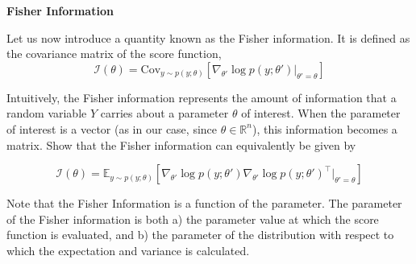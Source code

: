 \ifnum{} {
  \clearpage
} \fi
\item {} \textbf{Fisher Information}

Let us now introduce a quantity known as the Fisher information. It is defined as the covariance matrix of the score function,
$$\mathcal{I}(\theta) = \text{Cov}_{y \sim p(y;\theta)}[\nabla_{\theta'}\log p(y;\theta')|_{\theta'=\theta}]$$

Intuitively, the Fisher information represents the amount of information that a random variable $Y$ carries about a parameter $\theta$ of interest. When the parameter of interest is a vector (as in our case, since $\theta \in \mathbb{R}^n$), this information becomes a matrix. Show that the Fisher information can equivalently be given by

$$\mathcal{I}(\theta)=\mathbb{E}_{y\sim p(y;\theta)}[\nabla_{\theta'} \log p(y;\theta')\nabla_{\theta'} \log p(y;\theta')^\top|_{\theta'=\theta}]$$

Note that the Fisher Information is a function of the parameter. The parameter of the Fisher information is both a) the parameter value at which the score function is evaluated, and b) the parameter of the distribution with respect to which the expectation and variance is calculated.

\ifnum{} {
  
} \fi

